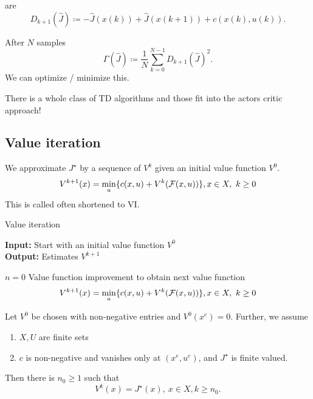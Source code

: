  are 
\[D_{k+1}(\hat{J})\coloneqq -\hat{J}(x(k))+\hat{J}(x(k+1))+c(x(k),u(k)).\]

After \(N\) samples 
\[\Gamma(\hat{J})\coloneqq \frac{1}{N}\sum_{k=0}^{N-1} D_{k+1}(\hat{J})^2.\]
We can optimize / minimize this.

There is a whole class of TD algorithms and those fit into the actors critic approach!


\subsection{Value iteration}

We approximate \(J^\star\) by a sequence of \(V^k\) given an initial value function \(V^0\).
\[V^{k+1}(x)=\min_{u}\{c(x,u)+V^k(\mathcal{F}(x,u))\}, x\in X,\ k\geq 0\]
This is called  often shortened to VI.

\begin{algorithm}[H]
    \caption{Value iteration}
    \textbf{Input:} Start with an initial value function \(V^0\)\\
    \textbf{Output:} Estimates \(V^{k+1}\)
    \begin{algorithmic}
    \State \(n=0\)
        \State Value function improvement to obtain next value function
            \[V^{k+1}(x)=\min_{u}\{c(x,u)+V^k(\mathcal{F}(x,u))\}, x\in X,\ k\geq 0\]
    \EndWhile
    \end{algorithmic}
\end{algorithm}

\begin{proposition}\label{prop:1.15}
    Let \(V^0\) be chosen with non-negative entries and \(V^0(x^e)=0\). Further,
    we assume
    \begin{enumerate}
        \item \(X,U\) are finite sets 
        \item \(c\) is non-negative and vanishes only at \((x^e,u^e)\), and \(J^\star\) is finite valued.
    \end{enumerate}
    Then there is \(n_0\geq 1\) such that 
    \[V^k(x)=J^\star(x), \ x\in X,k\geq n_0.\]
\end{proposition}

